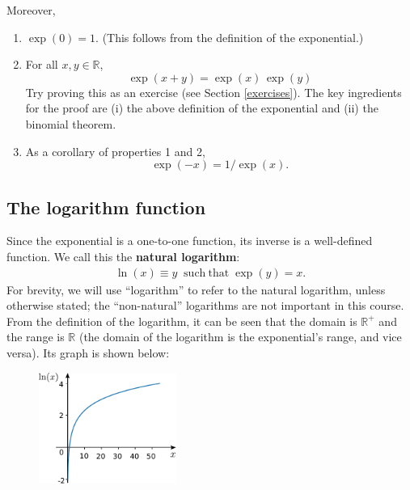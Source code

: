 \documentclass[10pt,a4paper]{article}
\begin{document}
Moreover,
\begin{enumerate}
\item $\exp(0) = 1$. (This follows from the definition of the exponential.)

\item For all $x, y \in \mathbb{R}$,
  \begin{equation}
    \exp(x+y) = \exp(x)\,\exp(y)
    \label{eq:exponential_add}
  \end{equation}
  Try proving this as an exercise (see Section \ref{exercises}). The
  key ingredients for the proof are (i) the above definition of the
  exponential and (ii) the binomial theorem.

\item As a corollary of properties 1 and 2,
  \begin{equation}
    \exp(-x) = 1/\exp(x).
  \end{equation}
\end{enumerate}

\subsection{The logarithm function}
\label{the-logarithm-function}

Since the exponential is a one-to-one function, its inverse is a
well-defined function.  We call this the \textbf{natural logarithm}:
\begin{align}
  \ln(x) \equiv y \;\; \mathrm{such}~\mathrm{that}\; \exp(y) = x.
\end{align}
For brevity, we will use ``logarithm'' to refer to the natural
logarithm, unless otherwise stated; the ``non-natural'' logarithms are
not important in this course. From the definition of the logarithm, it
can be seen that the domain is $\mathbb{R}^+$ and the range is
$\mathbb{R}$ (the domain of the logarithm is the exponential's range,
and vice versa).  Its graph is shown below:

\begin{figure}[ht]
  \centering\includegraphics[width=0.4\textwidth]{logarithm}
\end{figure}
\end{document}
